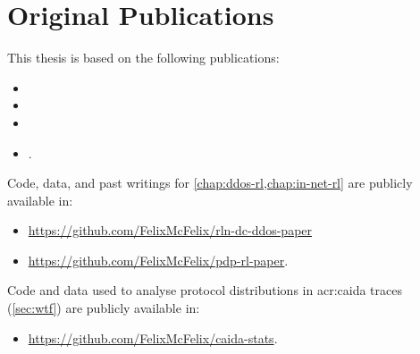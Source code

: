 \chapter*{Original Publications}

This thesis is based on the following publications:
{
\renewcommand*{\mkbibnamefamily}[1]{\textsc{#1}}
\renewcommand*{\mkbibnameprefix}[1]{\textsc{#1}}
\begin{itemize}
	\item {}
	\item {}
	\item {}
	\item {}.
\end{itemize}
}

Code, data, and past writings for \cref{chap:ddos-rl,chap:in-net-rl} are publicly available in:
\begin{itemize}
	\item \url{https://github.com/FelixMcFelix/rln-dc-ddos-paper}
	\item \url{https://github.com/FelixMcFelix/pdp-rl-paper}.
\end{itemize}

Code and data used to analyse protocol distributions in \gls{acr:caida} traces (\cref{sec:wtf}) are publicly available in:
\begin{itemize}
	\item \url{https://github.com/FelixMcFelix/caida-stats}.
\end{itemize}